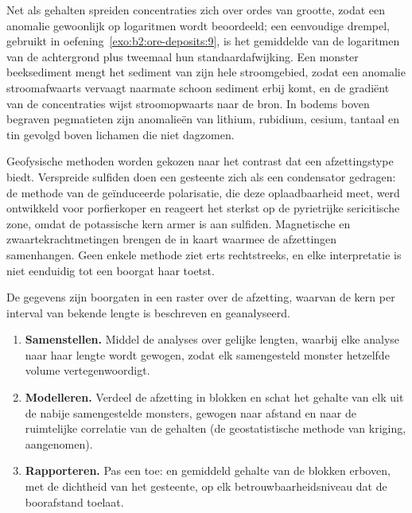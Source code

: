 Net als gehalten spreiden concentraties zich over ordes van grootte, zodat een anomalie gewoonlijk op
logaritmen wordt beoordeeld; een eenvoudige drempel, gebruikt in oefening~\ref{exo:b2:ore-deposits:9}, is het gemiddelde van
de logaritmen van de achtergrond plus tweemaal hun standaardafwijking. Een monster beeksediment
mengt het sediment van zijn hele stroomgebied, zodat een anomalie stroomafwaarts vervaagt naarmate schoon sediment
erbij komt, en de gradiënt van de concentraties wijst stroomopwaarts naar de bron. In bodems boven
begraven pegmatieten zijn anomalieën van lithium, rubidium, cesium, tantaal en tin gevolgd boven
lichamen die niet dagzomen.

Geofysische methoden worden gekozen naar het contrast dat een afzettingstype biedt. Verspreide sulfiden doen een
gesteente zich als een condensator gedragen: de methode van de geïnduceerde polarisatie, die deze oplaadbaarheid meet, werd
ontwikkeld voor porfierkoper en reageert het sterkst op de pyrietrijke sericitische zone, omdat de potassische
kern armer is aan sulfiden. Magnetische en zwaartekrachtmetingen brengen de  in kaart waarmee de afzettingen
samenhangen. Geen enkele methode ziet erts
rechtstreeks, en elke interpretatie is niet eenduidig tot een boorgat haar toetst.

\begin{method}\label{met:b2:ore-deposits:resource}
De gegevens zijn boorgaten in een raster over de afzetting, waarvan de kern per interval van
bekende lengte is beschreven en geanalyseerd.
\begin{enumerate}
  \item \textbf{Samenstellen.} Middel de analyses over gelijke lengten, waarbij elke analyse naar haar
        lengte wordt gewogen, zodat elk samengesteld monster hetzelfde volume vertegenwoordigt.
  \item \textbf{Modelleren.} Verdeel de afzetting in blokken en schat het gehalte van elk uit de
        nabije samengestelde monsters, gewogen naar afstand en naar de ruimtelijke correlatie van de gehalten
        (de geostatistische methode van kriging, aangenomen).
  \item \textbf{Rapporteren.} Pas een  toe:  en gemiddeld gehalte van de blokken erboven, met de
        dichtheid van het gesteente, op elk betrouwbaarheidsniveau dat de boorafstand toelaat.
\end{enumerate}
\end{method}

